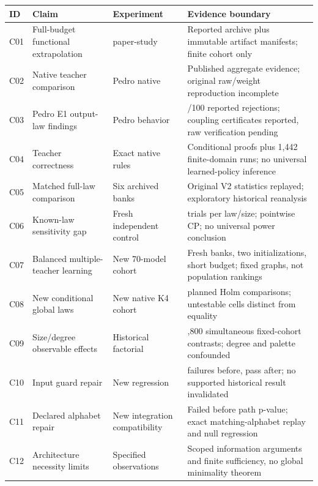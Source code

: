 \documentclass[
  11pt,
]{article}
\newcounter{none} %
\begin{document}
{\def\LTcaptype{none} %
\begin{longtable}[]{@{}
  >{\raggedright\arraybackslash}p{}
  >{\raggedright\arraybackslash}p{}
  >{\raggedright\arraybackslash}p{}
  >{\raggedright\arraybackslash}p{}@{}}
\toprule\noalign{}
\begin{minipage}[b]{\linewidth}\raggedright
ID
\end{minipage} & \begin{minipage}[b]{\linewidth}\raggedright
Claim
\end{minipage} & \begin{minipage}[b]{\linewidth}\raggedright
Experiment
\end{minipage} & \begin{minipage}[b]{\linewidth}\raggedright
Evidence boundary
\end{minipage} \\
\midrule\noalign{}
\endhead
\bottomrule\noalign{}
\endlastfoot
C01 & Full-budget functional extrapolation & paper-study & Reported
archive plus immutable artifact manifests; finite cohort only \\
C02 & Native teacher comparison & Pedro native & Published aggregate
evidence; original raw/weight reproduction incomplete \\
C03 & Pedro E1 output-law findings & Pedro behavior & 0/100 reported
rejections; coupling certificates reported, raw verification pending \\
C04 & Teacher correctness & Exact native rules & Conditional proofs plus
1,442 finite-domain runs; no universal learned-policy inference \\
C05 & Matched full-law comparison & Six archived banks & Original V2
statistics replayed; exploratory historical reanalysis \\
C06 & Known-law sensitivity gap & Fresh independent control & 20 trials
per law/size; pointwise CP; no universal power conclusion \\
C07 & Balanced multiple-teacher learning & New 70-model cohort & Fresh
banks, two initializations, short budget; fixed graphs, not population
rankings \\
C08 & New conditional global laws & New native K4 cohort & 350 planned
Holm comparisons; untestable cells distinct from equality \\
C09 & Size/degree observable effects & Historical factorial & 1,800
simultaneous fixed-cohort contrasts; degree and palette confounded \\
C10 & Input guard repair & New regression & 21 failures before, pass
after; no supported historical result invalidated \\
C11 & Declared alphabet repair & New integration compatibility & Failed
before path p-value; exact matching-alphabet replay and null
regression \\
C12 & Architecture necessity limits & Specified observations & Scoped
information arguments and finite sufficiency, no global minimality
theorem \\
\end{longtable}
}
\end{document}
